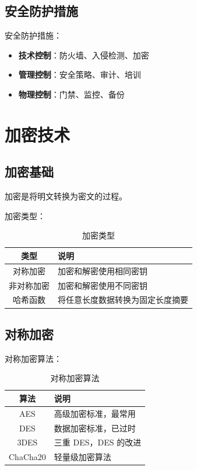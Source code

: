 \documentclass[12pt,UTF8]{ctexbook}
\begin{document}
\section{安全防护措施}
\label{sec:security_measures}

安全防护措施：
\begin{itemize}
    \item \textbf{技术控制}：防火墙、入侵检测、加密
    \item \textbf{管理控制}：安全策略、审计、培训
    \item \textbf{物理控制}：门禁、监控、备份
\end{itemize}

\chapter{加密技术}
\label{chap:cryptography}

\section{加密基础}
\label{sec:cryptography_basics}

加密是将明文转换为密文的过程。

加密类型：
\begin{table}[htbp]
    \centering
    \caption{加密类型}
    \begin{tabular}{|c|p{8cm}|}
        \hline
        \textbf{类型} & \textbf{说明} \\
        \hline
        对称加密 & 加密和解密使用相同密钥 \\
        \hline
        非对称加密 & 加密和解密使用不同密钥 \\
        \hline
        哈希函数 & 将任意长度数据转换为固定长度摘要 \\
        \hline
    \end{tabular}
\end{table}

\section{对称加密}
\label{sec:symmetric_encryption}

对称加密算法：
\begin{table}[htbp]
    \centering
    \caption{对称加密算法}
    \begin{tabular}{|c|p{8cm}|}
        \hline
        \textbf{算法} & \textbf{说明} \\
        \hline
        AES & 高级加密标准，最常用 \\
        \hline
        DES & 数据加密标准，已过时 \\
        \hline
        3DES & 三重 DES，DES 的改进 \\
        \hline
        ChaCha20 & 轻量级加密算法 \\
        \hline
    \end{tabular}
\end{table}
\end{document}
